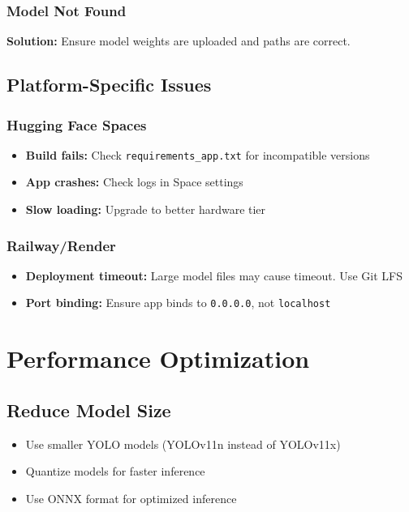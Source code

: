 \documentclass[11pt,a4paper]{article}
\begin{document}
\subsubsection{Model Not Found}
\begin{tcolorbox}[colback=yellow!5!white,colframe=yellow!75!black]
\textbf{Solution:} Ensure model weights are uploaded and paths are correct.
\end{tcolorbox}

\subsection{Platform-Specific Issues}

\subsubsection{Hugging Face Spaces}
\begin{itemize}
    \item \textbf{Build fails:} Check \texttt{requirements\_app.txt} for incompatible versions
    \item \textbf{App crashes:} Check logs in Space settings
    \item \textbf{Slow loading:} Upgrade to better hardware tier
\end{itemize}

\subsubsection{Railway/Render}
\begin{itemize}
    \item \textbf{Deployment timeout:} Large model files may cause timeout. Use Git LFS
    \item \textbf{Port binding:} Ensure app binds to \texttt{0.0.0.0}, not \texttt{localhost}
\end{itemize}

\section{Performance Optimization}

\subsection{Reduce Model Size}
\begin{itemize}
    \item Use smaller YOLO models (YOLOv11n instead of YOLOv11x)
    \item Quantize models for faster inference
    \item Use ONNX format for optimized inference
\end{itemize}
\end{document}
